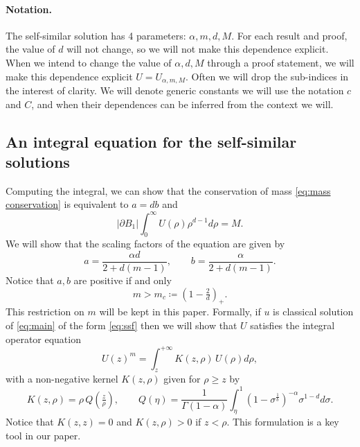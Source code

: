 \documentclass[a4paper]{article}
\theoremstyle{definition}
\begin{document}
\paragraph{Notation.} The self-similar solution has 4 parameters: $\alpha,m,d,M$. For each result and proof, the value of $d$ will not change, so we will not make this dependence explicit. When we intend to change the value of $\alpha,d,M$ through a proof statement, we will make this dependence explicit $U = U_{\alpha,m,M}$. Often we will drop the sub-indices in the interest of clarity. We will denote generic constants we will use the notation $c$ and $C$, and when their dependences can be inferred from the context we will.

\subsection{An integral equation for the self-similar solutions}

Computing the integral, we can show that the conservation of mass \eqref{eq:mass conservation} is equivalent to $a = db$ and
\begin{equation}
  \label{eq:profile mass}
  |\partial B_1| \int_0^\infty U(\rho) \rho^{d-1} d \rho  = M.
\end{equation}
We will show that the scaling factors of the equation are given by
\begin{equation}
  \label{eq:self-similar exponents}
  a = \frac{\alpha d}{2 + d(m-1)} , \qquad b = \frac{\alpha}{2+d(m-1)}.
\end{equation}
Notice that $a, b$ are positive if and only
\begin{equation}
  m>m_c \coloneqq (1-\tfrac{2}{d})_+.
\end{equation}
This restriction on $m$ will be kept in this paper.
Formally, if $u$ is classical solution of \eqref{eq:main} of the form \eqref{eq:ssf} then we will show that $U$ satisfies the integral operator equation
\begin{equation}
  \label{eq:profile equation}
  U(z)^{m} = \int_z^{+\infty} K(z,\rho) \, U(\rho) d\rho,
\end{equation}
with a non-negative kernel $ K(z,\rho)$ given for $\rho \ge z$ by
\begin{equation}
  \label{eq:Q}
  K(z,\rho)= \rho \, Q(\tfrac{z}{\rho}), \qquad Q(\eta) =
  \frac{1}{\Gamma(1-\alpha)}\int_\eta^1(1-\sigma^{\frac 1 b})^{-\alpha} \sigma^{1-d} d\sigma.
\end{equation}
Notice that $K(z,z) = 0$ and $K(z,\rho) > 0$ if $z < \rho$.
This formulation is a key tool in our paper.
\end{document}
